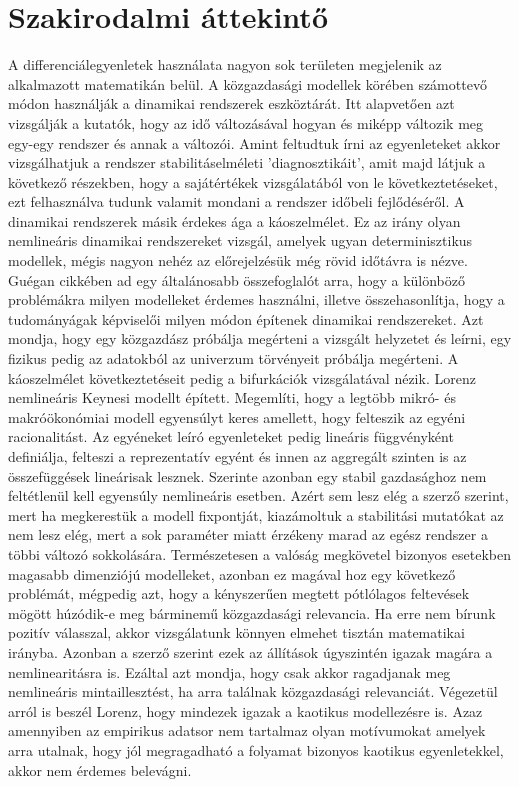 \documentclass{article}
\theoremstyle{definition}
\theoremstyle{theorem}
\begin{document}
\section{Szakirodalmi áttekintő}
A differenciálegyenletek használata nagyon sok területen megjelenik az alkalmazott matematikán belül. A közgazdasági modellek körében számottevő módon használják a dinamikai rendszerek eszköztárát. Itt alapvetően azt vizsgálják a kutatók, hogy az idő változásával hogyan és miképp változik meg egy-egy rendszer és annak a változói. Amint feltudtuk írni az egyenleteket akkor vizsgálhatjuk a rendszer stabilitáselméleti 'diagnosztikáit', amit majd látjuk a következő részekben, hogy a sajátértékek vizsgálatából von le következtetéseket, ezt felhasználva tudunk valamit mondani a rendszer  időbeli fejlődéséről.\newline
A dinamikai rendszerek másik érdekes ága a káoszelmélet. Ez az irány olyan nemlineáris dinamikai rendszereket vizsgál, amelyek ugyan determinisztikus modellek, mégis nagyon nehéz az előrejelzésük még rövid időtávra is nézve. Guégan \cite{GUEGAN200989} cikkében ad egy általánosabb összefoglalót arra, hogy a különböző problémákra milyen modelleket érdemes használni, illetve összehasonlítja, hogy a tudományágak képviselői milyen módon építenek dinamikai rendszereket.
Azt mondja, hogy egy közgazdász próbálja megérteni a vizsgált helyzetet és leírni, egy fizikus pedig az adatokból az univerzum törvényeit próbálja megérteni. A káoszelmélet következtetéseit pedig a bifurkációk vizsgálatával nézik. Lorenz \cite{Lorenz1994} nemlineáris Keynesi modellt épített. Megemlíti, hogy a legtöbb mikró- és makróökonómiai modell egyensúlyt keres amellett, hogy felteszik az egyéni racionalitást. Az egyéneket leíró egyenleteket pedig lineáris függvényként definiálja, felteszi a reprezentatív egyént és innen az aggregált szinten is az összefüggések lineárisak lesznek. Szerinte azonban egy stabil gazdasághoz nem feltétlenül kell egyensúly nemlineáris esetben. Azért sem lesz elég a szerző szerint, mert ha megkerestük a modell fixpontját, kiazámoltuk a stabilitási mutatókat az nem lesz elég, mert a sok paraméter miatt érzékeny marad az egész rendszer a többi változó sokkolására. Természetesen a valóság megkövetel bizonyos esetekben magasabb dimenziójú modelleket, azonban ez magával hoz egy következő problémát, mégpedig azt, hogy a kényszerűen megtett pótlólagos feltevések mögött húzódik-e meg bárminemű közgazdasági relevancia. Ha erre nem bírunk pozitív válasszal, akkor vizsgálatunk könnyen elmehet tisztán matematikai irányba. Azonban a szerző szerint ezek az állítások úgyszintén igazak magára a nemlinearitásra is. Ezáltal azt mondja, hogy csak akkor ragadjanak meg nemlineáris mintaillesztést, ha arra találnak közgazdasági relevanciát. Végezetül arról is beszél Lorenz, hogy mindezek igazak a kaotikus modellezésre is. Azaz amennyiben az empirikus adatsor nem tartalmaz olyan motívumokat amelyek arra utalnak, hogy jól megragadható a folyamat bizonyos kaotikus egyenletekkel, akkor nem érdemes belevágni.\newline
\end{document}
